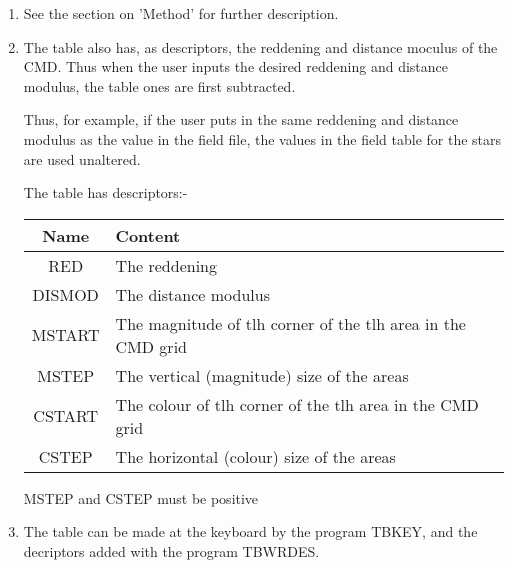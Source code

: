 \begin{small}
{{\begin{enumerate}
\item See the section on 'Method' for further description.

\item The table also has, as descriptors, the reddening and distance moculus
      of the CMD. Thus when the user inputs the desired reddening and
      distance modulus, the table ones are first subtracted.

      Thus, for example, if the user puts in the same reddening and distance
      modulus as the value in the field file, the values in the field
      table for the stars are used unaltered.

      The table has descriptors:-

\begin{tabular}{|c|p{4.0in}|}\hline
      Name   &  Content \\ \hline
      RED    &  The reddening \\
      DISMOD &  The distance modulus \\
      MSTART &  The magnitude of tlh corner of the tlh area in the CMD grid \\
      MSTEP  &  The vertical (magnitude) size of the areas \\
      CSTART &  The colour of tlh corner of the tlh area in the CMD grid \\
      CSTEP  &  The horizontal (colour) size of the areas \\ \hline
\end{tabular}

      MSTEP and CSTEP must be positive

\item The table can be made at the keyboard by the program TBKEY, and the
      decriptors added with the program TBWRDES.

\end{enumerate}


}}
\end{small}
